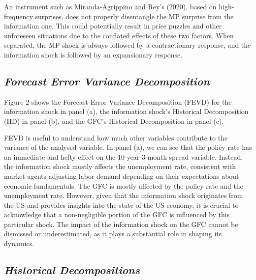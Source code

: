 \documentclass[11pt,a4paper]{article}
\begin{document}
An instrument such as Miranda-Agrippino and Rey's (2020), based on high-frequency surprises, does not properly disentangle the MP surprise from the information one. This could potentially result in price puzzles and other unforeseen situations due to the conflated effects of these two factors. When separated, the MP shock is always followed by a contractionary response, and the information shock is followed by an expansionary response.
    
\subsection{\textit{Forecast Error Variance Decomposition}}
Figure 2 shows the Forecast Error Variance Decomposition (FEVD) for the information shock in panel (a), the information shock's Historical Decomposition (HD) in panel (b), and the GFC's Historical Decomposition in panel (c).

FEVD is useful to understand how much other variables contribute to the variance of the analysed variable. 
In panel (a), we can see that the policy rate has an immediate and hefty effect on the 10-year-3-month spread variable. Instead, the information shock mostly affects the unemployment rate, consistent with market agents adjusting labor demand depending on their expectations about economic fundamentals.
The GFC is mostly affected by the policy rate and the unemployment rate. 
However, given that the information shock originates from the US and provides insights into the state of the US economy, it is crucial to acknowledge that a non-negligible portion of the GFC is influenced by this particular shock. The impact of the information shock on the GFC cannot be dismissed or underestimated, as it plays a substantial role in shaping its dynamics.

\subsection{\textit{Historical Decompositions}}
\end{document}
